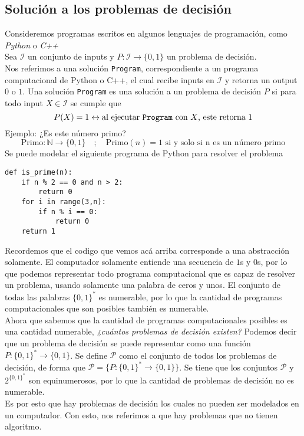 \documentclass[../main.tex]{subfiles}
\begin{document}
\subsection{Solución a los problemas de decisión}
Consideremos programas escritos en algunos lenguajes de programación, como \textit{Python} o \textit{C++}\\
Sea $\mathcal{I}$ un conjunto de inputs y $P: \mathcal{I} \rightarrow \{ 0,1 \}$ un problema de decisión.\\
Nos referimos a una solución \texttt{Program}, correspondiente a un programa computacional de Python o C++, el cual recibe inputs en $\mathcal{I}$ y retorna un output $0$ o $1$. Una solución \texttt{Program} es una solución a un problema de decisión $P$ si para todo input $X \in \mathcal{I}$ se cumple que
\[ P(X) = 1 \leftrightarrow \text{al ejecutar \texttt{Program} con } X \text{, este retorna } 1 \]
Ejemplo: ¿Es este número primo?
\[ \text{Primo}: \mathds{N} \rightarrow \{ 0,1 \} \quad ; \quad \text{Primo}(n) = 1 \text{ si y solo si n es un número primo} \]
Se puede modelar el siguiente programa de Python para resolver el problema
\begin{verbatim}
def is_prime(n):
    if n % 2 == 0 and n > 2:
        return 0
    for i in range(3,n):
        if n % i == 0:
            return 0
    return 1
\end{verbatim}

Recordemos que el codigo que vemos acá arriba corresponde a una abstracción solamente. El computador solamente entiende una secuencia de $1$s y $0$s, por lo que podemos representar todo programa computacional que es capaz de resolver un problema, usando solamente una palabra de ceros y unos. El conjunto de todas las palabras $\{ 0,1 \}^*$ es numerable, por lo que la cantidad de programas computacionales que son posibles también es numerable.\\
Ahora que sabemos que la cantidad de programas computacionales posibles es una cantidad numerable, \textit{¿cuántos problemas de decisión existen?} Podemos decir que un problema de decisión se puede representar como una función $P: \{ 0,1 \}^* \rightarrow \{ 0,1 \}$. Se define $\mathcal{P}$ como el conjunto de todos los problemas de decisión, de forma que $\mathcal{P} = \{ P: \{ 0,1 \}^* \rightarrow \{ 0,1 \} \}$. Se tiene que los conjuntos $\mathcal{P}$ y $2^{\{ 0,1 \}^*}$ son equinumerosos, por lo que la cantidad de problemas de decisión no es numerable.\\
Es por esto que hay problemas de decisión los cuales no pueden ser modelados en un computador. Con esto, nos referimos a que hay problemas que no tienen algoritmo.
\end{document}
